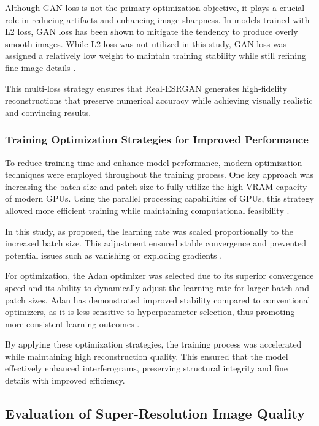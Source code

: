 \documentclass[10pt,twocolumn]{article}
\begin{document}
Although GAN loss is not the primary optimization objective, it plays a crucial role in reducing artifacts and enhancing image sharpness. In models trained with L2 loss, GAN loss has been shown to mitigate the tendency to produce overly smooth images. While L2 loss was not utilized in this study, GAN loss was assigned a relatively low weight to maintain training stability while still refining fine image details \cite{BulatSuperRes}.

This multi-loss strategy ensures that Real-ESRGAN generates high-fidelity reconstructions that preserve numerical accuracy while achieving visually realistic and convincing results.

\subsubsection{Training Optimization Strategies for Improved Performance}
To reduce training time and enhance model performance, modern optimization techniques were employed throughout the training process. One key approach was increasing the batch size and patch size to fully utilize the high VRAM capacity of modern GPUs. Using the parallel processing capabilities of GPUs, this strategy allowed more efficient training while maintaining computational feasibility \cite{Goyal2017}.

In this study, as proposed, the learning rate was scaled proportionally to the increased batch size. This adjustment ensured stable convergence and prevented potential issues such as vanishing or exploding gradients \cite{You2017}.

For optimization, the Adan optimizer was selected due to its superior convergence speed and its ability to dynamically adjust the learning rate for larger batch and patch sizes. Adan has demonstrated improved stability compared to conventional optimizers, as it is less sensitive to hyperparameter selection, thus promoting more consistent learning outcomes \cite{Xie2022}.

By applying these optimization strategies, the training process was accelerated while maintaining high reconstruction quality. This ensured that the model effectively enhanced interferograms, preserving structural integrity and fine details with improved efficiency.

\subsection{Evaluation of Super-Resolution Image Quality}
\end{document}
